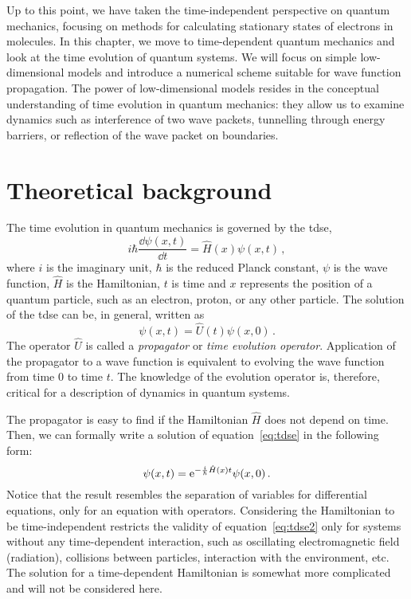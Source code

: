 Up to this point, we have taken the time-independent perspective on quantum mechanics, focusing on methods for calculating stationary states of electrons in molecules. In this chapter, we move to time-dependent quantum mechanics and look at the time evolution of quantum systems. We will focus on simple low-dimensional models and introduce a numerical scheme suitable for wave function propagation. The power of low-dimensional models resides in the conceptual understanding of time evolution in quantum mechanics: they allow us to examine dynamics such as interference of two wave packets, tunnelling through energy barriers, or reflection of the wave packet on boundaries.

\section{Theoretical background}
\label{sec:qdtheoback}

The time evolution in quantum mechanics is governed by the \acrfull{tdse},
\begin{equation}
    i\hbar\frac{\dd\psi(x,t)}{\dd t} = \hat{H}(x)\psi(x,t) \, ,
    \label{eq:tdse}
\end{equation}
where $i$ is the imaginary unit, $\hbar$ is the reduced Planck constant, $\psi$ is the wave function, $\hat{H}$ is the Hamiltonian, $t$ is time and $x$ represents the position of a quantum particle, such as an electron, proton, or any other particle. The solution of the \acrshort{tdse} can be, in general, written as
\begin{equation}
    \psi(x,t) = \hat{U}(t)\psi(x,0) \, .
    \label{eq:U}
\end{equation}
The operator $\hat{U}$ is called a \textit{propagator} or \textit{time evolution operator}. Application of the propagator to a wave function is equivalent to evolving the wave function from time 0 to time $t$. The knowledge of the evolution operator is, therefore, critical for a description of dynamics in quantum systems.

The propagator is easy to find if the Hamiltonian $\hat{H}$ does not depend on time. Then, we can formally write a solution of equation~\eqref{eq:tdse} in the following form:
\begin{equation}
    \psi(x,t) = \mathrm{e}^{-\frac{i}{\hbar}\hat{H}(x)t} \psi(x,0)\, .
    \label{eq:tdse2}
\end{equation}
Notice that the result resembles the separation of variables for differential equations, only for an equation with operators. Considering the Hamiltonian to be time-independent restricts the validity of equation~\eqref{eq:tdse2} only for systems without any time-dependent interaction, such as oscillating electromagnetic field (radiation), collisions between particles, interaction with the environment, etc. The solution for a time-dependent Hamiltonian is somewhat more complicated and will not be considered here.

